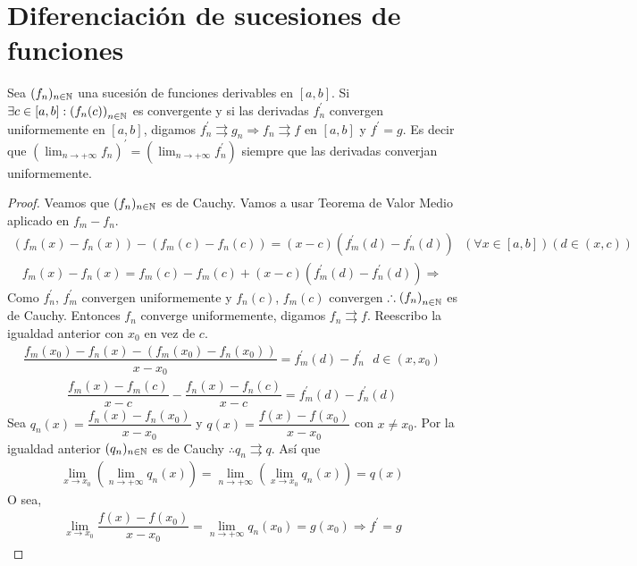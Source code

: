 \section{Diferenciación de sucesiones de funciones}

\begin{theorem}
  Sea \((f_n)_{n \in \mathbb{N}} \) una sucesión de funciones derivables en \([a, b]\). Si \(\exists c \in [a, b] : {(f_n(c))}_{n \in \mathbb{N}} \) es convergente y si las derivadas \(f_n^{\prime} \) convergen uniformemente en \([a, b]\), digamos \(f_n^{\prime} \rightrightarrows g_n \Rightarrow f_n \rightrightarrows f\) en \([a, b]\) y \(f^{\prime} = g\).
  Es decir que \({(\lim_{n \to +\infty} f_n)}^{\prime} = (\lim_{n \to +\infty} f_n^{\prime})\) siempre que las derivadas converjan uniformemente.
  \begin{proof}
    Veamos que \((f_n)_{n \in \mathbb{N}} \) es de Cauchy. Vamos a usar Teorema de Valor Medio aplicado en \(f_m - f_n\). \begin{align*}
      (f_m(x) - f_n(x)) - (f_m(c) - f_n(c)) = (x-c)(f_m^{\prime}(d) - f_n^{\prime}(d)) \text{  } (\forall x \in [a, b])(d \in (x, c))
    \end{align*}
    \begin{align*}
      f_m(x) - f_n(x) = f_m(c) - f_m(c) + (x-c) (f_m^{\prime}(d) - f_n^{\prime}(d)) \Rightarrow
    \end{align*} Como \(f_n^{\prime} \), \(f_m^{\prime} \) convergen uniformemente y \(f_n(c)\), \(f_m(c)\) convergen \(\therefore {(f_n)}_{n \in \mathbb{N}} \) es de Cauchy. Entonces \(f_n\) converge uniformemente, digamos \(f_n \rightrightarrows f\). Reescribo la igualdad anterior con \(x_0\) en vez de \(c\).
    \begin{align*}
      \dfrac{f_m(x_0) - f_n(x) - (f_m(x_0) - f_n(x_0))}{x - x_0} = f_m^{\prime}(d) - f_n^{\prime} \text{  } d \in (x, x_0)
    \end{align*}
    \begin{align*}
      \dfrac{f_m(x) - f_m(c)}{x - c} - \dfrac{f_n(x) - f_n(c)}{x - c} = f_m^{\prime}(d) - f_n^{\prime}(d)
    \end{align*}
    Sea \(q_n(x) = \dfrac{f_n(x)-f_n(x_0)}{x-x_0} \) y \(q(x) = \dfrac{f(x)-f(x_0)}{x - x_0} \) con \(x \neq x_0\). Por la igualdad anterior \((q_n)_{n \in \mathbb{N}} \) es de Cauchy \(\therefore q_n \rightrightarrows q\). Así que \begin{align*}
      \lim_{x \to x_0} (\lim_{n \to +\infty} q_n(x)) = \lim_{n \to +\infty}(\lim_{x \to x_0} q_n(x)) = q(x)
    \end{align*} O sea, \begin{align*}
      \lim_{x \to x_0} \dfrac{f(x) - f(x_0)}{x-x_0} = \lim_{n \to +\infty} q_n(x_0) = g(x_0) \Rightarrow f^{\prime} = g
    \end{align*}
  \end{proof}
\end{theorem}

